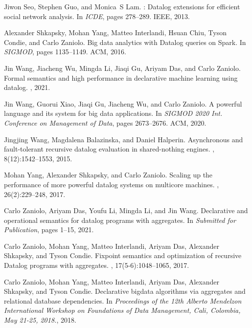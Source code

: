 \documentclass[11pt]{article}
\begin{document}
\begin{thebibliography}{10}
{
Jiwon Seo, Stephen Guo, and Monica~S Lam.
: {Datalog} extensions for efficient social network
  analysis.
\newblock In {\em ICDE}, pages 278--289. IEEE, 2013.

Alexander Shkapsky, Mohan Yang, Matteo Interlandi, Hsuan Chiu, Tyson Condie,
  and Carlo Zaniolo.
\newblock Big data analytics with {Datalog} queries on {Spark}.
\newblock In {\em SIGMOD}, pages 1135--1149. ACM, 2016.

Jin Wang, Jiacheng Wu, Mingda Li, Jiaqi Gu, Ariyam Das, and Carlo Zaniolo.
\newblock Formal semantics and high performance in declarative machine learning
  using datalog.
, 2021.

Jin Wang, Guorui Xiao, Jiaqi Gu, Jiacheng Wu, and Carlo Zaniolo.
 {A} powerful language and its system for big data
  applications.
\newblock In {\em {SIGMOD} 2020 Int. Conference on Management of Data}, pages
  2673--2676. {ACM}, 2020.

Jingjing Wang, Magdalena Balazinska, and Daniel Halperin.
\newblock Asynchronous and fault-tolerant recursive datalog evaluation in
  shared-nothing engines.
, 8(12):1542--1553, 2015.

Mohan Yang, Alexander Shkapsky, and Carlo Zaniolo.
\newblock Scaling up the performance of more powerful datalog systems on
  multicore machines.
, 26(2):229--248, 2017.

Carlo Zaniolo, Ariyam Das, Youfu Li, Mingda Li, and Jin Wang.
\newblock Declarative and operational semantics for datalog programs with
  aggregates.
\newblock In {\em Submitted for Publication}, pages 1--15, 2021.

Carlo Zaniolo, Mohan Yang, Matteo Interlandi, Ariyam Das, Alexander Shkapsky,
  and Tyson Condie.
\newblock Fixpoint semantics and optimization of recursive {Datalog} programs
  with aggregates.
, 17(5-6):1048--1065, 2017.

Carlo Zaniolo, Mohan Yang, Matteo Interlandi, Ariyam Das, Alexander Shkapsky,
  and Tyson Condie.
\newblock Declarative bigdata algorithms via aggregates and relational database
  dependencies.
\newblock In {\em Proceedings of the 12th Alberto Mendelzon International
  Workshop on Foundations of Data Management, Cali, Colombia, May 21-25,
  2018.}, 2018. }

\end{thebibliography}
\end{document}
